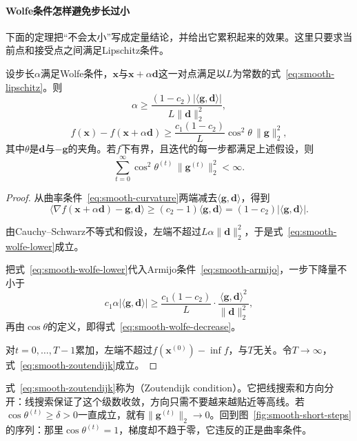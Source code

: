 \paragraph{Wolfe条件怎样避免步长过小}
下面的定理把“不会太小”写成定量结论，并给出它累积起来的效果。这里只要求当前点和接受点之间满足Lipschitz条件。

\begin{theorem}[Wolfe步长的下界与累积下降]
\label{thm:smooth-wolfe-decrease}
设步长$\alpha$满足Wolfe条件，$\bm{x}$与$\bm{x}+\alpha\bm{d}$这一对点满足以$L$为常数的式~\eqref{eq:smooth-lipschitz}。则
\begin{equation}
 \alpha\geq\frac{(1-c_2)\lvert\langle\bm{g},\bm{d}\rangle\rvert}{L\lVert\bm{d}\rVert_2^2},
 \label{eq:smooth-wolfe-lower}
\end{equation}
\begin{equation}
 f(\bm{x})-f(\bm{x}+\alpha\bm{d})\geq\frac{c_1(1-c_2)}{L}\cos^2\theta\,\lVert\bm{g}\rVert_2^2,
 \label{eq:smooth-wolfe-decrease}
\end{equation}
其中$\theta$是$\bm{d}$与$-\bm{g}$的夹角。若$f$下有界，且迭代的每一步都满足上述假设，则
\begin{equation}
 \sum_{t=0}^{\infty}\cos^2\theta^{(t)}\,\lVert\bm{g}^{(t)}\rVert_2^2<\infty.
 \label{eq:smooth-zoutendijk}
\end{equation}
\end{theorem}

\begin{proof}
从曲率条件~\eqref{eq:smooth-curvature}两端减去$\langle\bm{g},\bm{d}\rangle$，得到
\[
 \langle\nabla f(\bm{x}+\alpha\bm{d})-\bm{g},\bm{d}\rangle\geq(c_2-1)\langle\bm{g},\bm{d}\rangle=(1-c_2)\lvert\langle\bm{g},\bm{d}\rangle\rvert.
\]

由Cauchy--Schwarz不等式和假设，左端不超过$L\alpha\lVert\bm{d}\rVert_2^2$，于是式~\eqref{eq:smooth-wolfe-lower}成立。

把式~\eqref{eq:smooth-wolfe-lower}代入Armijo条件~\eqref{eq:smooth-armijo}，一步下降量不小于
\[
 c_1\alpha\lvert\langle\bm{g},\bm{d}\rangle\rvert\geq\frac{c_1(1-c_2)}{L}\cdot\frac{\langle\bm{g},\bm{d}\rangle^2}{\lVert\bm{d}\rVert_2^2},
\]
再由$\cos\theta$的定义，即得式~\eqref{eq:smooth-wolfe-decrease}。

对$t=0,\ldots,T-1$累加，左端不超过$f(\bm{x}^{(0)})-\inf f$，与$T$无关。令$T\to\infty$，式~\eqref{eq:smooth-zoutendijk}成立。
\end{proof}

式~\eqref{eq:smooth-zoutendijk}称为（Zoutendijk condition）。它把线搜索和方向分开：线搜索保证了这个级数收敛，方向只需不要越来越贴近等高线。若$\cos\theta^{(t)}\geq\delta>0$一直成立，就有$\lVert\bm{g}^{(t)}\rVert_2\to0$。回到图~\ref{fig:smooth-short-steps}的序列：那里$\cos\theta^{(t)}=1$，梯度却不趋于零，它违反的正是曲率条件。

